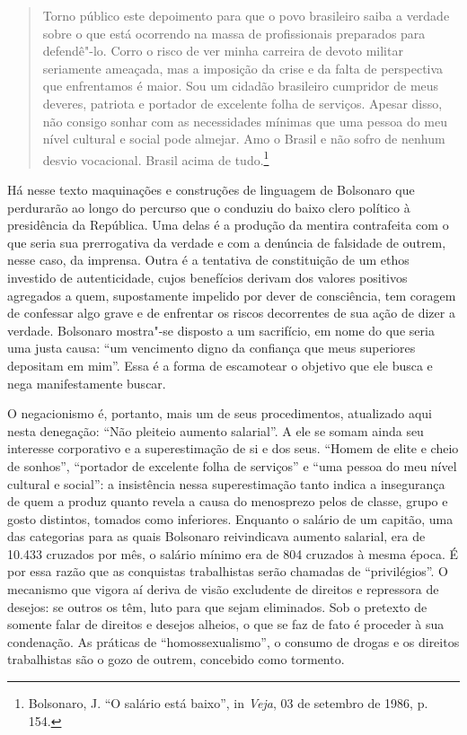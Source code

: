\begin{quote}
Torno público este depoimento para que o povo brasileiro saiba a verdade
sobre o que está ocorrendo na massa de profissionais preparados para
defendê"-lo. Corro o risco de ver minha carreira de devoto militar
seriamente ameaçada, mas a imposição da crise e da falta de perspectiva
que enfrentamos é maior. Sou um cidadão brasileiro cumpridor de meus
deveres, patriota e portador de excelente folha de serviços. Apesar
disso, não consigo sonhar com as necessidades mínimas que uma pessoa do
meu nível cultural e social pode almejar. Amo o Brasil e não sofro de
nenhum desvio vocacional. Brasil acima de tudo.\footnote{Bolsonaro, J.
  ``O salário está baixo'', in \emph{Veja}, 03 de setembro de 1986, p.\,154.}
\end{quote}

Há nesse texto maquinações e construções de linguagem de Bolsonaro que
perdurarão ao longo do percurso que o conduziu do baixo clero político à
presidência da República. Uma delas é a produção da mentira contrafeita
com o que seria sua prerrogativa da verdade e com a denúncia de
falsidade de outrem, nesse caso, da imprensa. Outra é a tentativa de
constituição de um ethos investido de autenticidade, cujos benefícios
derivam dos valores positivos agregados a quem, supostamente impelido
por dever de consciência, tem coragem de confessar algo grave e de
enfrentar os riscos decorrentes de sua ação de dizer a verdade.
Bolsonaro mostra"-se disposto a um sacrifício, em nome do que seria uma
justa causa: ``um vencimento digno da confiança que meus superiores
depositam em mim''. Essa é a forma de escamotear o objetivo que ele
busca e nega manifestamente buscar.

O negacionismo é, portanto, mais um de seus procedimentos, atualizado
aqui nesta denegação: ``Não pleiteio aumento salarial''. A ele se somam
ainda seu interesse corporativo e a superestimação de si e dos seus.
``Homem de elite e cheio de sonhos'', ``portador de excelente folha de
serviços'' e ``uma pessoa do meu nível cultural e social'': a
insistência nessa superestimação tanto indica a insegurança de quem a
produz quanto revela a causa do menosprezo pelos de classe, grupo e
gosto distintos, tomados como inferiores. Enquanto o salário de um
capitão, uma das categorias para as quais Bolsonaro reivindicava aumento
salarial, era de 10.433 cruzados por mês, o salário mínimo era de 804
cruzados à mesma época. É por essa razão que as conquistas trabalhistas
serão chamadas de ``privilégios''. O mecanismo que vigora aí deriva de
visão excludente de direitos e repressora de desejos: se outros os têm,
luto para que sejam eliminados. Sob o pretexto de somente falar de
direitos e desejos alheios, o que se faz de fato é proceder à sua
condenação. As práticas de ``homossexualismo'', o consumo de drogas e os
direitos trabalhistas são o gozo de outrem, concebido como tormento.

